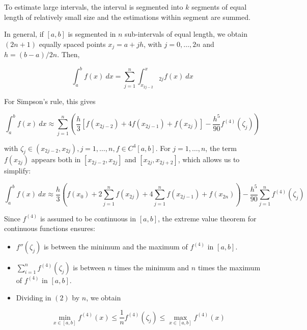 \documentclass[12pt]{article}
\theoremstyle{definition}
\begin{document}
To estimate large intervals, the interval is segmented into $k$ segments of
equal length of relatively small size and the estimations within segment are
summed. 

In general, if $[a, b]$ is segmented in $n$ sub-intervals of equal length, we
obtain $(2n+1)$ equally spaced points $x_j = a + jh$, with $j = 0, \ldots, 2n$
and $h = (b-a) / 2n$. Then, 

\begin{equation*}
    \int_a^b f(x) ~ dx = \sum_{j=1}^n \int_{x_{2j-2}}^x_{2j} f(x) ~ dx
\end{equation*}

For Simpson's rule, this gives 

\begin{equation*}
    \int_a^b f(x) ~ dx \approx \sum_{j=1}^n \left( \frac{h}{3}\left[ f(x_{2j
    -2}) + 4f(x_{2j - 1}) + f(x_{2j}) \right] - \frac{h^5}{90}f^{(4)}(\zeta_j)  \right) 
\end{equation*}

with $\zeta_j \in (x_{2j-2}, x_{2j}), j = 1, \ldots, n, f \in C^4[a, b]$.
For $j = 1, \ldots, n$, the term $f(x_{2j})$ appears both in 
$[x_{2j-2}, x_{2j}]$ and $[x_{2j}, x_{2j+2}]$, which allows us to simplify:


\begin{equation*}
    \int_a^b f(x) ~ dx \approx \frac{h}{3} \left( f(x_0) + 2 \sum_{j=1}^n
    f(x_{2j}) + 4 \sum_{j=1}^n f(x_{2j - 1}) + f(x_{2n}) \right) -
    \frac{h^5}{90}\sum_{j=1}^n f^{(4)} (\zeta_j)
\end{equation*}



Since $f^{(4)}$ is assumed to be continuous in $[a, b]$, the extreme value
theorem for continuous functions ensures:

\begin{itemize}
    \item $f''(\zeta_j)$ is between the minimum and the maximum of $f^{(4)}$ 
        in $[a, b]$.
    \item $\sum_{i=1}^n f^{(4)} (\zeta_j)$ is between $n$ times the minimum and
        $n$ times the maximum of $f^{(4)}$ in $[a, b]$.
    \item Dividing in $(2)$ by $n$, we obtain 

        \begin{equation*}
            \min_{x \in [a, b]} f^{(4)}(x) \leq \frac{1}{n} f^{(4)}(\zeta_j)
            \leq \max_{x \in [a,b]} f^{(4)}(x)
        \end{equation*}
\end{itemize}
\end{document}
